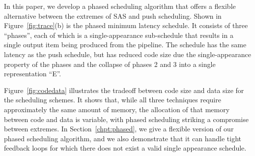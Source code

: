 In this paper, we develop a phased scheduling algorithm that offers a
flexible alternative between the extremes of SAS and push scheduling.
Shown in Figure~\ref{fig:trace}(b) is the phased minimum latency
schedule.  It consists of three ``phases'', each of which is a
single-appearance sub-schedule that results in a single output item
being produced from the pipeline.  The schedule has the same latency
as the push schedule, but has reduced code size due the
single-appearance property of the phases and the collapse of phases 2
and 3 into a single representation ``E''.

Figure~\ref{fig:codedata} illustrates the tradeoff between code size
and data size for the scheduling schemes.  It shows that, while all
three techniques require approximately the same amount of memory, the
allocation of that memory between code and data is variable, with
phased scheduling striking a compromise between extremes.  In
Section~\ref{chpt:phased}, we give a flexible version of our phased
scheduling algorithm, and we also demonstrate that it can handle tight
feedback loops for which there does not exist a valid single
appearance schedule.

\begin{comment}
We can compare the storage efficiency of these two schedules by
assuming that one data item in a buffer requires $x$ amount of memory
and each entry in a schedule requires $y$ amount of memory.  Thus the
two schedules will require the same amount of storage to store
themselves and execute if $11 x + 18 y = 39 x + 4 y$.

\begin{displaymath}
\begin{array}{rcl}
11 x + 18 y & = & 39 x + 4 y \\
14 y & = & 28 x \\
y & = & 2x
\end{array}
\end{displaymath}

Thus the smaller schedule is more efficient if every data item
requires less than twice the amount of storage than every entry in
the schedule.

One of the difficulties in scheduling {\StreamIt} programs lies in
finding a good set of trade-offs between schedule size and
buffering requirements.
\end{comment}

